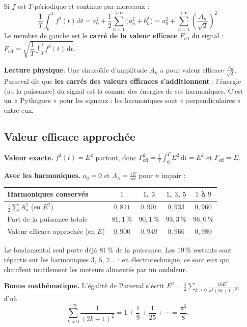 \documentclass[a4paper,11pt]{article}
\begin{document}
\begin{theoreme}\label{th:parseval}
Si $f$ est $T$-périodique et continue par morceaux :
\[
\boxed{\frac1T\int_0^T f^2(t)\,\mathrm dt = a_0^2 + \frac12\sum_{n=1}^{+\infty}\big(a_n^2 + b_n^2\big) = a_0^2 + \sum_{n=1}^{+\infty}\left(\frac{A_n}{\sqrt2}\right)^2}
\]
Le membre de gauche est le \textbf{carré de la valeur efficace} $F_{\text{eff}}$ du signal : $F_{\text{eff}} = \sqrt{\dfrac1T\displaystyle\int_0^T f^2(t)\,\mathrm dt}$.
\end{theoreme}

\begin{tcolorbox}[colback=white, colframe=uimmblue, boxrule=0.8pt, arc=3pt]
\textbf{Lecture physique.} Une sinusoïde d'amplitude $A_n$ a pour valeur efficace $\frac{A_n}{\sqrt 2}$. Parseval dit que \textbf{les carrés des valeurs efficaces s'additionnent} : l'énergie (ou la puissance) du signal est la somme des énergies de ses harmoniques. C'est un « Pythagore » pour les signaux : les harmoniques sont « perpendiculaires » entre eux.
\end{tcolorbox}

\subsection{Valeur efficace approchée}\label{subsec:approchee}

\begin{appliindus}\label{ex:parsevalcreneau}
\textbf{Valeur exacte.} $f^2(t) = E^2$ partout, donc $F_{\text{eff}}^2 = \frac1T\int_0^T E^2\,\mathrm dt = E^2$ et $F_{\text{eff}} = E$.

\textbf{Avec les harmoniques.} $a_0 = 0$ et $A_n = \frac{4E}{n\pi}$ pour $n$ impair :
\begin{center}
\renewcommand{\arraystretch}{1.3}
\begin{tabular}{|l|c|c|c|c|}
\hline
\rowcolor{uimmlightblue}
Harmoniques conservés & $1$ & $1$, $3$ & $1$, $3$, $5$ & $1$ à $9$ \\
\hline
$\frac12\sum A_n^2$ (en $E^2$) & $0{,}811$ & $0{,}901$ & $0{,}933$ & $0{,}960$ \\
\hline
Part de la puissance totale & $81{,}1\,\%$ & $90{,}1\,\%$ & $93{,}3\,\%$ & $96{,}0\,\%$ \\
\hline
Valeur efficace approchée (en $E$) & $0{,}900$ & $0{,}949$ & $0{,}966$ & $0{,}980$ \\
\hline
\end{tabular}
\end{center}
Le fondamental seul porte déjà $81\,\%$ de la puissance. Les $19\,\%$ restants sont répartis sur les harmoniques $3$, $5$, $7$\dots\ : en électrotechnique, ce sont eux qui chauffent inutilement les moteurs alimentés par un onduleur.

\textbf{Bonus mathématique.} L'égalité de Parseval s'écrit $E^2 = \frac12\sum_{k\geq 0}\frac{16E^2}{\pi^2(2k+1)^2}$, d'où
\[
\sum_{k=0}^{+\infty}\frac{1}{(2k+1)^2} = 1 + \frac19 + \frac1{25} + \cdots = \frac{\pi^2}{8}.
\]
\end{appliindus}
\end{document}
